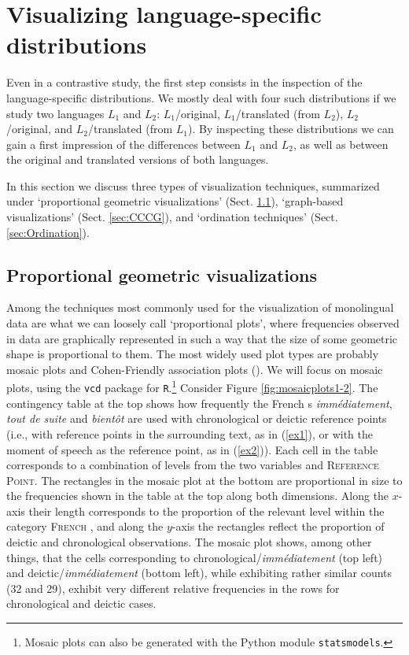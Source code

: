 
\section{Visualizing language-specific distributions}\label{sec:LanguageSpecific}

Even in a contrastive study, the first step consists in the inspection
of the language-specific distributions. We mostly deal with four such
distributions if we study two languages $L_1$ and $L_2$: 
$L_1$/original, $L_1$/translated (from $L_2$), $L_2$/original, and
$L_2$/translated (from $L_1$). By inspecting these distributions we
can gain a first impression of the differences between $L_1$ and
$L_2$, as well as between the original and translated
versions of both languages.

In this section we discuss three types of visualization techniques,
summarized under `proportional geometric visualizations'
(Sect. \ref{sec:PropGeom}), `graph-based visualizations'
(Sect. \ref{sec:CCCG}), and `ordination techniques'
(Sect. \ref{sec:Ordination}).

\subsection{Proportional geometric visualizations}\label{sec:PropGeom}

Among the techniques most commonly used for the visualization of
monolingual data are what we can loosely call `proportional plots',
where frequencies observed in data are graphically represented in such
a way that the size of some geometric shape is 
proportional to them. The most widely used plot types are
probably mosaic plots and Cohen-Friendly association plots
(\citealt{Cohen1980,Friendly1992,Friendly1994}). We will focus on mosaic plots,
using the \verb+vcd+ package for \verb+R+.\footnote{Mosaic plots can
  also be generated with the Python module \verb+statsmodels+.}
Consider Figure \ref{fig:mosaicplots1-2}. The contingency table at the
top shows how frequently the French \pradv s
\textit{immédiatement}, \textit{tout de suite} and \textit{bientôt}
are used with chronological or deictic reference points (i.e., with
reference points in the surrounding text, as in (\ref{ex1}), or with
the moment of speech as the reference point, as in (\ref{ex2})).
%
Each cell in the table corresponds to a combination of levels from the two
variables \textsc{\pradv} and \textsc{Reference Point}.
%
The rectangles in the mosaic plot at the bottom are proportional in size to
the frequencies shown in the table at the top along both
dimensions. Along the $x$-axis their length corresponds to the
proportion of the relevant level within the category \textsc{French
  \pradv}, and along the $y$-axis the rectangles reflect the
proportion of deictic and chronological observations.
%
The mosaic plot shows, among other things, that the cells
corresponding to chronological/\textit{immédiatement} (top left) and
deictic/\textit{immédiatement} (bottom left), while exhibiting rather
similar counts (32 and 29), exhibit very different relative
frequencies in the rows for chronological and deictic cases.

